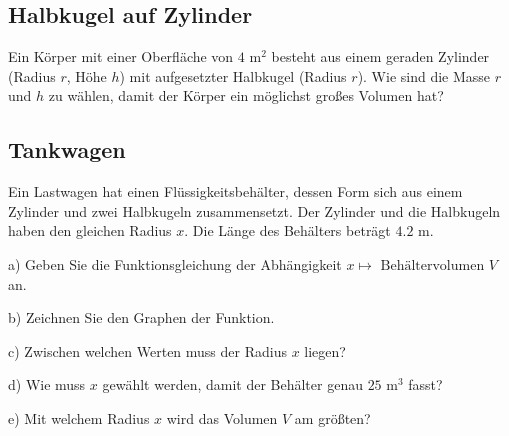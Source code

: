 \subsection{Halbkugel auf Zylinder}
Ein Körper mit einer Oberfläche von $4 \text{ m}^2$ besteht aus einem geraden Zylinder (Radius $r$, Höhe $h$) mit aufgesetzter Halbkugel (Radius $r$). Wie sind die Masse $r$ und $h$ zu wählen, damit der Körper ein möglichst großes Volumen hat?


\subsection{Tankwagen}

Ein Lastwagen hat einen Flüssigkeitsbehälter, dessen
Form sich aus einem Zylinder und zwei Halbkugeln zusammensetzt. Der Zylinder und die Halbkugeln haben den
gleichen Radius $x$. Die Länge des Behälters beträgt $4.2 \text{ m}$.


a) 
Geben Sie die Funktionsgleichung der Abhängigkeit $x \mapsto \text{ Behältervolumen } V$ an.

b)
Zeichnen Sie den Graphen der Funktion.

c)
Zwischen welchen Werten muss der Radius $x$ liegen?

d)
Wie muss $x$ gewählt werden, damit der Behälter genau $25 \text{ m}^3$
fasst?

e)
Mit welchem Radius $x$ wird das Volumen $V$ am größten?



